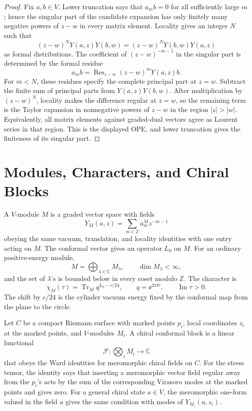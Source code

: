 \begin{proof}
Fix \(a,b\in V\).  Lower truncation says that \(a_m b=0\) for all sufficiently
large \(m\); hence the singular part of the candidate expansion has only
finitely many negative powers of \(z-w\) in every matrix element.  Locality
gives an integer \(N\) such that
\[
  (z-w)^N Y(a,z)Y(b,w)=(z-w)^N Y(b,w)Y(a,z)
\]
as formal distributions.  The coefficient of \((z-w)^{-m-1}\) in the singular
part is determined by the formal residue
\[
  a_m b=\operatorname{Res}_{z-w}(z-w)^mY(a,z)b .
\]
For \(m<N\), these residues specify the complete principal part at \(z=w\).
Subtract the finite sum of principal parts from \(Y(a,z)Y(b,w)\).  After
multiplication by \((z-w)^N\), locality makes the difference regular at
\(z=w\), so the remaining term is the Taylor expansion in nonnegative powers
of \(z-w\) in the region \(|z|>|w|\).  Equivalently, all matrix elements
against graded-dual vectors agree as Laurent series in that region.  This is
the displayed OPE, and lower truncation gives the finiteness of its singular
part.
\end{proof}

\section{Modules, Characters, and Chiral Blocks}

A \(V\)-module \(M\) is a graded vector space with fields
\[
  Y_M(a,z)=\sum_{m\in\mathbb Z}a^M_m z^{-m-1}
\]
obeying the same vacuum, translation, and locality identities with one entry
acting on \(M\).  The conformal vector gives an operator \(L_0\) on \(M\).
For an ordinary positive-energy module,
\[
  M=\bigoplus_{\lambda\in\mathbb C}M_\lambda,\qquad
  \dim M_\lambda<\infty,
\]
and the set of \(\lambda\)'s is bounded below in every coset modulo
\(\mathbb Z\).  The character is
\begin{equation}
  \chi_M(\tau)
  =
  \operatorname{Tr}_M q^{L_0-c/24},
  \qquad
  q=\ee^{2\pi\ii\tau},
  \qquad
  \operatorname{Im}\tau>0 .
  \label{eq:voa-character}
\end{equation}
The shift by \(c/24\) is the cylinder vacuum energy fixed by the conformal map
from the plane to the circle.

Let \(C\) be a compact Riemann surface with marked points \(p_i\), local
coordinates \(z_i\) at the marked points, and \(V\)-modules \(M_i\).  A chiral
conformal block is a linear functional
\[
  \mathcal F:\bigotimes_i M_i\longrightarrow\mathbb C
\]
that obeys the Ward identities for meromorphic chiral fields on \(C\).  For
the stress tensor, the identity says that inserting a meromorphic vector field
regular away from the \(p_i\)'s acts by the sum of the corresponding Virasoro
modes at the marked points and gives zero.  For a general chiral state
\(a\in V\), the meromorphic one-form valued in the field \(a\) gives the same
condition with modes of \(Y_{M_i}(a,z_i)\).

